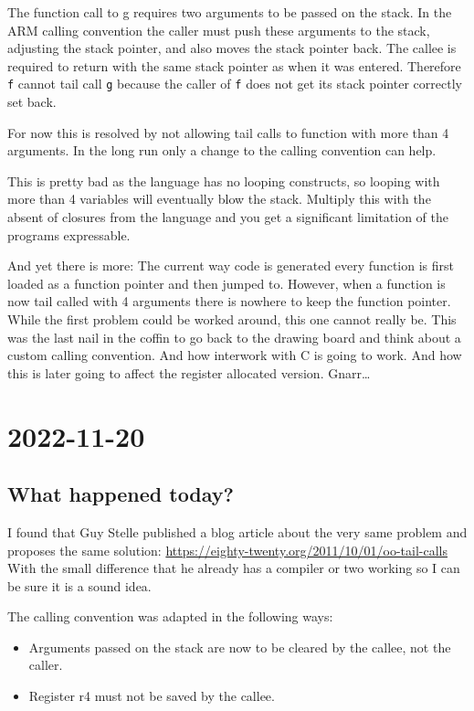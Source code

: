 \documentclass[12pt, article]{article}
\begin{document}
The function call to g requires two arguments to be passed on the
stack.
In the ARM calling convention the caller must push these arguments to
the stack, adjusting the stack pointer, and also moves the stack
pointer back.
The callee is required to return with the same stack pointer as when
it was entered.
Therefore \texttt{f} cannot tail call \texttt{g} because the caller of
\texttt{f} does not get its stack pointer correctly set back.

For now this is resolved by not allowing tail calls to function with
more than 4 arguments.
In the long run only a change to the calling convention can help.

This is pretty bad as the language has no looping constructs, so
looping with more than 4 variables will eventually blow the stack.
Multiply this with the absent of closures from the language and you
get a significant limitation of the programs expressable.

And yet there is more:
The current way code is generated every function is first loaded as a
function pointer and then jumped to.
However, when a function is now tail called with 4 arguments there is
nowhere to keep the function pointer.
While the first problem could be worked around, this one cannot really
be.
This was the last nail in the coffin to go back to the drawing board
and think about a custom calling convention.
And how interwork with C is going to work.
And how this is later going to affect the register allocated version.
Gnarr\ldots

\section{2022-11-20}

\subsection{What happened today?}

I found that Guy Stelle published a blog article about the very same
problem and proposes the same solution:
\url{https://eighty-twenty.org/2011/10/01/oo-tail-calls}
With the small difference that he already has a compiler or two
working so I can be sure it is a sound idea.

The calling convention was adapted in the following ways:
\begin{itemize}
\item Arguments passed on the stack are now to be cleared by the
  callee, not the caller.
\item Register r4 must not be saved by the callee.
\end{itemize}
\end{document}

